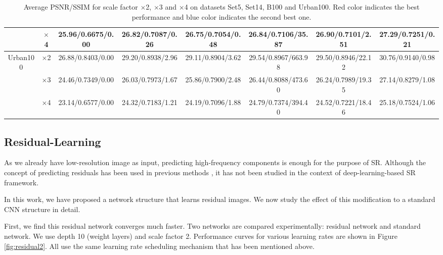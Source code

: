 \documentclass[10pt,twocolumn,letterpaper]{article}
\begin{document}
\begin{table}
\begin{center}
\begin{tabular}{ | c | c | c | c | c | c | c | c | }
 & $\times$4 & 25.96/0.6675/0.00 & 26.82/0.7087/{\color{blue}0.26} & 26.75/0.7054/0.48 & 26.84/{\color{blue}0.7106}/35.87 & {\color{blue}26.90}/0.7101/2.51 & {\color{red}27.29}/{\color{red}0.7251}/{\color{red}0.21}\\
\hline
\hline
\multirow{3}{*}{Urban100} & $\times$2 & 26.88/0.8403/0.00 & 29.20/0.8938/{\color{blue}2.96} & 29.11/0.8904/3.62 & {\color{blue}29.54}/{\color{blue}0.8967}/663.98 & 29.50/0.8946/22.12 & {\color{red}30.76}/{\color{red}0.9140}/{\color{red}0.98}\\
 & $\times$3 & 24.46/0.7349/0.00 & 26.03/0.7973/{\color{blue}1.67} & 25.86/0.7900/2.48 & {\color{blue}26.44}/{\color{blue}0.8088}/473.60 & 26.24/0.7989/19.35 & {\color{red}27.14}/{\color{red}0.8279}/{\color{red}1.08}\\
 & $\times$4 & 23.14/0.6577/0.00 & 24.32/0.7183/{\color{blue}1.21} & 24.19/0.7096/1.88 & {\color{blue}24.79}/{\color{blue}0.7374}/394.40 & 24.52/0.7221/18.46 & {\color{red}25.18}/{\color{red}0.7524}/{\color{red}1.06}\\
\hline
\end{tabular}
\caption{Average PSNR/SSIM for scale factor $\times$2, $\times$3 and $\times$4 on datasets Set5, Set14, B100 and Urban100. {\color{red}Red color} indicates the best performance and {\color{blue}blue color} indicates the second best one.}
\label{tbl:benchmark}
\end{center}
\end{table}


\subsection{Residual-Learning}
\label{sec:residual}

As we already have low-resolution image as input, predicting high-frequency components is enough for the purpose of SR. Although the concept of predicting residuals has been used in previous methods \cite{Timofte2013, Timofte,zeyde2012single}, it has not been studied in the context of deep-learning-based SR framework.

In this work, we have proposed a network structure that learns residual images. We now study the effect of this modification to a standard CNN structure in detail. 

First, we find this residual network converges much faster. Two networks are compared experimentally: residual network and standard network. We use depth 10 (weight layers) and scale factor 2. Performance curves for various learning rates are shown in Figure \ref{fig:residual2}. All use the same learning rate scheduling mechanism that has been mentioned above. 
\end{document}
